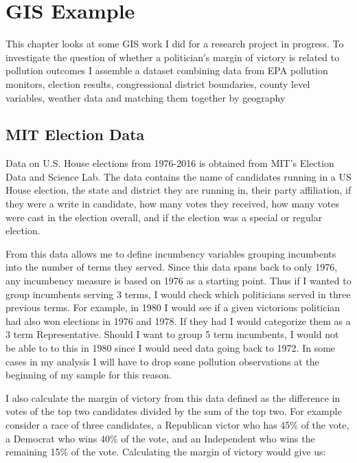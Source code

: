 \documentclass[
]{book}
\begin{document}
\hypertarget{GIS}{%
\chapter{GIS Example}\label{GIS}}

This chapter looks at some GIS work I did for a research project in progress. To investigate the question of whether a politician's margin of victory is related to pollution outcomes I assemble a dataset combining data from EPA pollution monitors, election results, congressional district boundaries, county level variables, weather data and matching them together by geography

\hypertarget{mit-election-data}{%
\section{MIT Election Data}\label{mit-election-data}}

Data on U.S. House elections from 1976-2016 is obtained from MIT's Election Data and Science Lab. The data contains the name of candidates running in a US House election, the state and district they are running in, their party affiliation, if they were a write in candidate, how many votes they received, how many votes were cast in the election overall, and if the election was a special or regular election.

From this data allows me to define incumbency variables grouping incumbents into the number of terms they served. Since this data spans back to only 1976, any incumbency measure is based on 1976 as a starting point. Thus if I wanted to group incumbents serving 3 terms, I would check which politicians served in three previous terms. For example, in 1980 I would see if a given victorious politician had also won elections in 1976 and 1978. If they had I would categorize them as a 3 term Representative. Should I want to group 5 term incumbents, I would not be able to to this in 1980 since I would need data going back to 1972. In some cases in my analysis I will have to drop some pollution observations at the beginning of my sample for this reason.

I also calculate the margin of victory from this data defined as the difference in votes of the top two candidates divided by the sum of the top two. For example consider a race of three candidates, a Republican victor who has 45\% of the vote, a Democrat who wins 40\% of the vote, and an Independent who wins the remaining 15\% of the vote. Calculating the margin of victory would give us:
\end{document}
